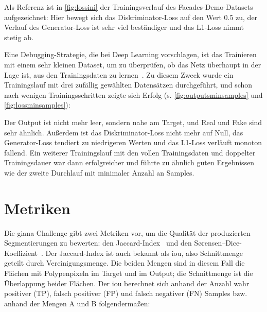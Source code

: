 

Als Referenz ist in \autoref{fig:lossini} der Trainingsverlauf des Facades-Demo-Datasets aufgezeichnet:
Hier bewegt sich das Diskriminator-Loss auf den Wert 0.5 zu, der Verlauf des Generator-Loss ist sehr viel beständiger und das L1-Loss nimmt stetig ab.

Eine Debugging-Strategie, die \citeauthor{Goodfellow.2016} bei Deep Learning vorschlagen, ist das Trainieren mit einem sehr kleinen Dataset, um zu überprüfen, ob das Netz überhaupt in der Lage ist, aus den Trainingsdaten zu lernen~\cite{Goodfellow.2016}.
Zu diesem Zweck wurde ein Trainingslauf mit drei zufällig gewählten Datensätzen durchgeführt, und schon nach wenigen Trainingsschritten zeigte sich Erfolg (s. \autoref{fig:outputsminsamples} und \autoref{fig:lossminsamples}):



Der Output ist nicht mehr leer, sondern nahe am Target, und Real und Fake sind sehr ähnlich.
Außerdem ist das Diskriminator-Loss nicht mehr auf Null, das Generator-Loss tendiert zu niedrigeren Werten und das L1-Loss verläuft monoton fallend.
Ein weiterer Trainingslauf mit den vollen Trainingsdaten und doppelter Trainingsdauer war dann erfolgreicher und führte zu ähnlich guten Ergebnissen wie der zweite Durchlauf mit minimaler Anzahl an Samples.



\section{Metriken}

Die \gls{giana} Challenge gibt zwei Metriken vor, um die Qualität der produzierten Segmentierungen zu bewerten: den Jaccard-Index~\cite{Jaccard.1901} und den Sørensen–Dice-Koeffizient~\cite{Srensen.1948,Dice.1945}.
Der Jaccard-Index ist auch bekannt als \gls{iou}, also Schnittmenge geteilt durch Vereinigungsmenge.
Die beiden Mengen sind in diesem Fall die Flächen mit Polypenpixeln im Target und im Output; die Schnittmenge ist die Überlappung beider Flächen.
Der \gls{iou} berechnet sich anhand der Anzahl wahr positiver (TP), falsch positiver (FP) und falsch negativer (FN) Samples bzw. anhand der Mengen A und B folgendermaßen:

